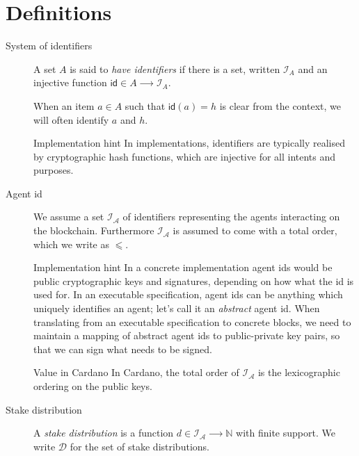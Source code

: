 \documentclass{article}
\newenvironment{currentvalue}{\begin{bclogo}[noborder=true,
    logo=\bcinfo, epBarre=3, couleurBarre=YellowOrange]{Value in Cardano}}{\end{bclogo}}
\newenvironment{implementationhint}{\begin{bclogo}[noborder=true,
    logo=\bccrayon, epBarre=3, couleurBarre=PineGreen]{Implementation hint}}{\end{bclogo}}
\newcommand{\idsof}[1]{\mathcal{I}\!_#1}
\newcommand{\id}{\mathsf{id}}
\newcommand{\agentids}{\idsof{\mathcal{A}}}
\newcommand{\stakedistributions}{\mathcal{D}}
\begin{document}
\section{Definitions}
\label{sec:definitions}

\begin{description}
\item[System of identifiers] A set $A$ is said to \emph{have
    identifiers} if there is a set, written $\idsof{A}$ and an
  injective function $\id ∈ A ⟶ \idsof{A}$.

  When an item $a∈A$ such that $\id(a) = h$ is clear from the context,
  we will often identify $a$ and $h$.

  \begin{implementationhint}
    In implementations, identifiers are typically realised by
    cryptographic hash functions, which are injective for all intents
    and purposes.
  \end{implementationhint}

\item[Agent id] We assume a set $\agentids$ of identifiers
  representing the agents interacting on the blockchain. Furthermore
  $\agentids$ is assumed to come with a total order, which we write as
  $⩽$.
  \begin{implementationhint}
    In a concrete implementation agent ids would be public
    cryptographic keys and signatures, depending on how what the id is
    used for. In an executable specification, agent ids can be
    anything which uniquely identifies an agent; let's call it an
    \emph{abstract} agent id. When translating from an executable
    specification to concrete blocks, we need to maintain a mapping of
    abstract agent ids to public-private key pairs, so that we can
    sign what needs to be signed.
  \end{implementationhint}
  
  \begin{currentvalue}
    In Cardano, the total order of $\agentids$ is the lexicographic
    ordering on the public keys.
  \end{currentvalue}

\item[Stake distribution] A \emph{stake distribution} is a function
  $d ∈ \agentids ⟶ ℕ$ with finite support. We write
  $\stakedistributions$ for the set of stake distributions.


\end{description}
\end{document}
